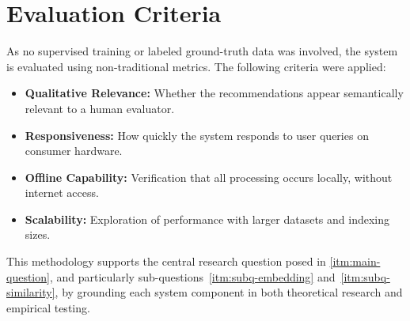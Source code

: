\section{Evaluation Criteria}
\label{sec:evaluation-criteria}

As no supervised training or labeled ground-truth data was involved, the system is evaluated using non-traditional metrics. The following criteria were applied:

\begin{itemize}
    \item \textbf{Qualitative Relevance:} Whether the recommendations appear semantically relevant to a human evaluator.
    \item \textbf{Responsiveness:} How quickly the system responds to user queries on consumer hardware.
    \item \textbf{Offline Capability:} Verification that all processing occurs locally, without internet access.
    \item \textbf{Scalability:} Exploration of performance with larger datasets and indexing sizes.
\end{itemize}

This methodology supports the central research question posed in \autoref{itm:main-question}, and particularly sub-questions~\ref{itm:subq-embedding} and~\ref{itm:subq-similarity}, by grounding each system component in both theoretical research and empirical testing.

